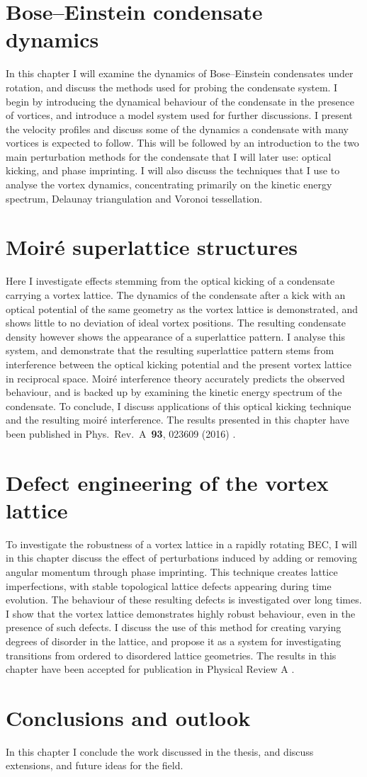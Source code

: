 \section*{Bose--Einstein condensate dynamics}
In this chapter I will examine the dynamics of Bose--Einstein condensates under rotation, and discuss the methods used for probing the condensate system. I begin by introducing the dynamical behaviour of the condensate in the presence of vortices, and introduce a model system used for further discussions. I present the velocity profiles and discuss some of the dynamics a condensate with many vortices is expected to follow. This will be followed by an introduction to the two main perturbation methods for the condensate that I will later use: optical kicking, and phase imprinting. I will also discuss the techniques that I use to analyse the vortex dynamics, concentrating primarily on the kinetic energy spectrum, Delaunay triangulation and Voronoi tessellation.

\section*{Moir\'e superlattice structures}
Here I investigate effects stemming from the optical kicking of a condensate carrying a vortex lattice. The dynamics of the condensate after a kick with an optical potential of the same geometry as the vortex lattice is demonstrated, and shows little to no deviation of ideal vortex positions. The resulting condensate density however shows the appearance of a superlattice pattern. I analyse this system, and demonstrate that the resulting superlattice pattern stems from interference between the optical kicking potential and the present vortex lattice in reciprocal space. Moir\'e interference theory accurately predicts the observed behaviour, and is backed up by examining the kinetic energy spectrum of the condensate. To conclude, I discuss applications of this optical kicking technique and the resulting moir\'e interference. The results presented in this chapter have been published in Phys.~Rev.~A~\textbf{93}, 023609 (2016) \cite{VTX:oriordan_pra_2016}.

\section*{Defect engineering of the vortex lattice}
To investigate the robustness of a vortex lattice in a rapidly rotating BEC, I will in this chapter discuss the effect of perturbations induced by adding or removing angular momentum through phase imprinting. This technique creates lattice imperfections, with stable topological lattice defects appearing during time evolution. The behaviour of these resulting defects is investigated over long times. I show that the vortex lattice demonstrates highly robust behaviour, even in the presence of such defects. I discuss the use of this method for creating varying degrees of disorder in the lattice, and propose it as a system for investigating transitions from ordered to disordered lattice geometries. The results in this chapter have been accepted for publication in Physical Review A \cite{ME:arxiv_defect}.

\section*{Conclusions and outlook}
In this chapter I conclude the work discussed in the thesis, and discuss extensions, and future ideas for the field.
